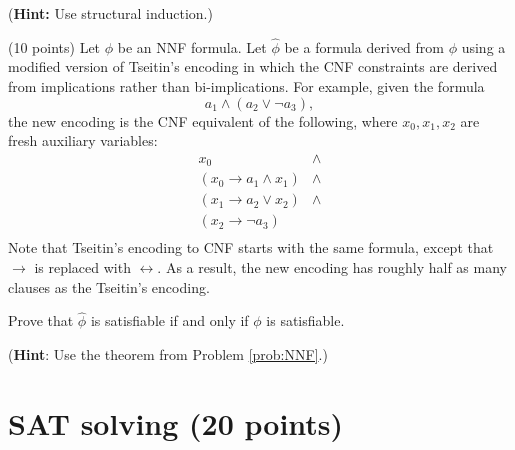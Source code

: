 \documentclass{handout}
\begin{document}
\begin{questions}
(\textbf{Hint:} Use structural induction.) \label{prob:NNF}



\item (10 points) Let $\phi$ be an NNF formula.  Let $\hat{\phi}$ be a formula derived from $\phi$ using a modified version of Tseitin's encoding in which the CNF constraints are derived from implications rather than bi-implications.   For example, given the formula
\[a_1\land (a_2 \lor \neg a_3),\]
the new encoding is the CNF equivalent of the following, where $x_0, x_1, x_2$ are fresh auxiliary variables:
\[
\begin{array}{ll}
x_0 & \land \\
(x_0 \rightarrow a_1 \land x_1) & \land \\
(x_1 \rightarrow a_2 \lor x_2) & \land \\
(x_2 \rightarrow \neg a_3) &  \\
\end{array}
\]
Note that Tseitin's encoding to CNF starts with the same formula, except that $\rightarrow$ is replaced with $\leftrightarrow$.  As a result, the new encoding has roughly half as many clauses as the Tseitin's encoding.

\medskip
Prove that $\hat{\phi}$ is satisfiable if and only if $\phi$ is satisfiable.  

\medskip
(\textbf{Hint}: Use the theorem from Problem \ref{prob:NNF}.)



\end{questions}

\pagebreak

\section{SAT solving (20 points)}\label{solving}
\end{document}
